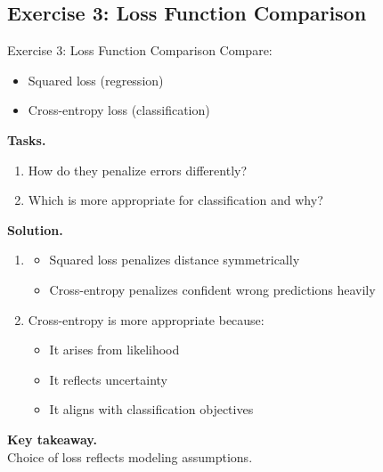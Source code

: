 \documentclass[aspectratio=169,11pt]{beamer}
\begin{document}
\subsection{Exercise 3: Loss Function Comparison}
\begin{frame}[t,allowframebreaks]{Exercise 3: Loss Function Comparison}
\small
Compare:

\begin{itemize}
    \item Squared loss (regression)
    \item Cross-entropy loss (classification)
\end{itemize}

\textbf{Tasks.}\\ \begin{enumerate}
    \item How do they penalize errors differently?
    \item Which is more appropriate for classification and why?
\end{enumerate}

\textbf{Solution.}\\ \begin{enumerate}
\item 
\begin{itemize}
    \item Squared loss penalizes distance symmetrically
    \item Cross-entropy penalizes confident wrong predictions heavily
\end{itemize}

\item Cross-entropy is more appropriate because:
\begin{itemize}
    \item It arises from likelihood
    \item It reflects uncertainty
    \item It aligns with classification objectives
\end{itemize}
\end{enumerate}

\textbf{Key takeaway.}\\ Choice of loss reflects modeling assumptions.
\end{frame}
\end{document}
